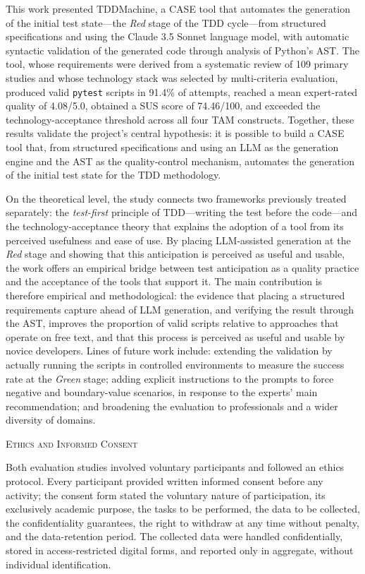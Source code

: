 \documentclass[10pt,journal,twoside,letterpaper]{IEEEtran}
\newcommand{\seccionetica}[1]{%
    \vspace{0.6em}
    \noindent\textsc{Ethics and Informed Consent}
    \par\vspace{0.2em}
    \small #1
    \par
}
\begin{document}
    This work presented TDDMachine, a CASE tool that automates the generation of the initial test state---the \emph{Red} stage of the TDD cycle---from structured specifications and using the Claude 3.5 Sonnet language model, with automatic syntactic validation of the generated code through analysis of Python's AST. The tool, whose requirements were derived from a systematic review of 109 primary studies and whose technology stack was selected by multi-criteria evaluation, produced valid \texttt{pytest} scripts in 91.4\% of attempts, reached a mean expert-rated quality of 4.08/5.0, obtained a SUS score of 74.46/100, and exceeded the technology-acceptance threshold across all four TAM constructs. Together, these results validate the project's central hypothesis: it is possible to build a CASE tool that, from structured specifications and using an LLM as the generation engine and the AST as the quality-control mechanism, automates the generation of the initial test state for the TDD methodology.
    
    On the theoretical level, the study connects two frameworks previously treated separately: the \emph{test-first} principle of TDD---writing the test before the code---and the technology-acceptance theory that explains the adoption of a tool from its perceived usefulness and ease of use. By placing LLM-assisted generation at the \emph{Red} stage and showing that this anticipation is perceived as useful and usable, the work offers an empirical bridge between test anticipation as a quality practice and the acceptance of the tools that support it. The main contribution is therefore empirical and methodological: the evidence that placing a structured requirements capture ahead of LLM generation, and verifying the result through the AST, improves the proportion of valid scripts relative to approaches that operate on free text, and that this process is perceived as useful and usable by novice developers. Lines of future work include: extending the validation by actually running the scripts in controlled environments to measure the success rate at the \emph{Green} stage; adding explicit instructions to the prompts to force negative and boundary-value scenarios, in response to the experts' main recommendation; and broadening the evaluation to professionals and a wider diversity of domains.
    
    \seccionetica{%
        Both evaluation studies involved voluntary participants and followed an ethics protocol. Every participant provided written informed consent before any activity; the consent form stated the voluntary nature of participation, its exclusively academic purpose, the tasks to be performed, the data to be collected, the confidentiality guarantees, the right to withdraw at any time without penalty, and the data-retention period. The collected data were handled confidentially, stored in access-restricted digital forms, and reported only in aggregate, without individual identification.
    }
    
\end{document}
